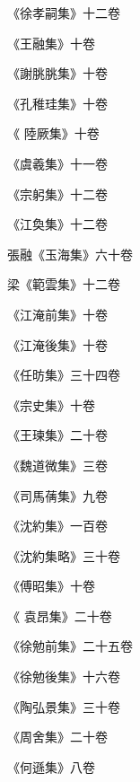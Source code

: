 \begin{pinyinscope}
 《徐孝嗣集》十二卷



 《王融集》十卷



 《謝朓朓集》十卷



 《孔稚珪集》十卷



 《
 陸厥集》十卷



 《虞羲集》十一卷



 《宗躬集》十二卷



 《江奐集》十二卷



 張融《玉海集》六十卷



 梁《範雲集》十二卷



 《江淹前集》十卷



 《江淹後集》十卷



 《任昉集》三十四卷



 《宗史集》十卷



 《王瑓集》二十卷



 《魏道微集》三卷



 《司馬蒨集》九卷



 《沈約集》一百卷



 《沈約集略》三十卷



 《傅昭集》十卷



 《
 袁昂集》二十卷



 《徐勉前集》二十五卷



 《徐勉後集》十六卷



 《陶弘景集》三十卷



 《周舍集》二十卷



 《何遜集》八卷




\end{pinyinscope}

